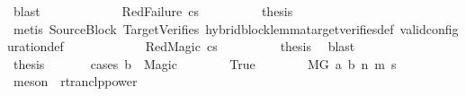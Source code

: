 \begin{isabellebody}
\ blast\isanewline
\ \ \ \ \isamarkupfalse%
\isanewline
\ \ \ \ \ \ \isamarkupfalse%
\ {\isacharparenleft}{\kern0pt}RedFailure\ cs{\isacharparenright}{\kern0pt}\isanewline
\ \ \ \ \ \ \isamarkupfalse%
\ \isamarkupfalse%
\ {\isacharquery}{\kern0pt}thesis\isanewline
\ \ \ \ \ \ \ \ \isamarkupfalse%
\ {\isacharparenleft}{\kern0pt}metis\ SourceBlock\ TargetVerifies\ hybrid{\isacharunderscore}{\kern0pt}block{\isacharunderscore}{\kern0pt}lemma{\isacharunderscore}{\kern0pt}target{\isacharunderscore}{\kern0pt}verifies{\isacharunderscore}{\kern0pt}def\ valid{\isacharunderscore}{\kern0pt}configuration{\isacharunderscore}{\kern0pt}def{\isacharparenright}{\kern0pt}\isanewline
\ \ \ \ \isamarkupfalse%
\isanewline
\ \ \ \ \ \ \isamarkupfalse%
\ {\isacharparenleft}{\kern0pt}RedMagic\ cs{\isacharparenright}{\kern0pt}\isanewline
\ \ \ \ \ \ \isamarkupfalse%
\ \isamarkupfalse%
\ {\isacharquery}{\kern0pt}thesis\ \isamarkupfalse%
\ blast\isanewline
\ \ \ \ \isamarkupfalse%
\isanewline
\ \ \ \ \isamarkupfalse%
\ \isamarkupfalse%
\ {\isacharquery}{\kern0pt}thesis\ \isanewline
\ \ \ \ \isamarkupfalse%
\ {\isacharparenleft}{\kern0pt}cases\ {\isachardoublequoteopen}b\ {\isacharequal}{\kern0pt}\ Magic{\isachardoublequoteclose}{\isacharparenright}{\kern0pt}\isanewline
\ \ \ \ \ \ \isamarkupfalse%
\ True\isanewline
\ \ \ \ \ \ \isamarkupfalse%
\ {\isachardoublequoteopen}M{\isacharcomma}{\kern0pt}{\isasymLambda}{\isacharcomma}{\kern0pt}{\isasymGamma}{\isacharcomma}{\kern0pt}{\isasymOmega}{\isacharcomma}{\kern0pt}G\ {\isasymturnstile}{\isacharparenleft}{\kern0pt}a{\isacharcomma}{\kern0pt}\ b{\isacharparenright}{\kern0pt}\ {\isacharminus}{\kern0pt}n{\isasymrightarrow}{\isacharasterisk}{\kern0pt}\ {\isacharparenleft}{\kern0pt}m{\isacharprime}{\kern0pt}{\isacharcomma}{\kern0pt}\ s{\isacharprime}{\kern0pt}{\isacharparenright}{\kern0pt}{\isachardoublequoteclose}\isanewline
\ \ \ \ \ \ \ \ \isamarkupfalse%
\ {\isacharparenleft}{\kern0pt}meson\ {\isachardoublequoteopen}{}{\isachardoublequoteclose}{\isacharparenleft}{\kern0pt}{}{\isacharparenright}{\kern0pt}\ rtranclp{\isacharunderscore}{\kern0pt}power{\isacharparenright}{\kern0pt}\isanewline
\ \ \ \ \ \ \isamarkupfalse%
\ \isamarkupfalse%

\end{isabellebody}
